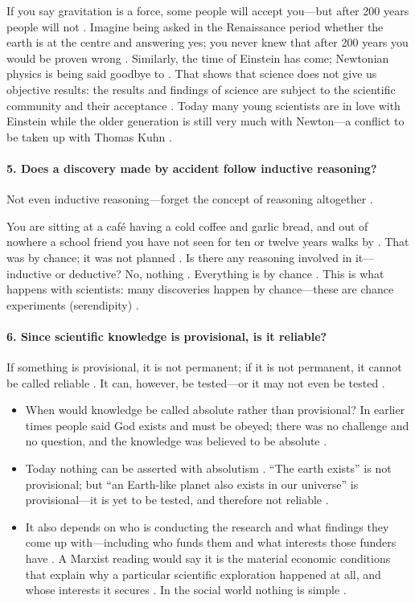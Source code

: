 If you say gravitation is a force, some people will accept you---but after 200 years people will not . Imagine being asked in the Renaissance period whether the earth is at the centre and answering yes; you never knew that after 200 years you would be proven wrong . Similarly, the time of Einstein has come; Newtonian physics is being said goodbye to . That shows that science does not give us objective results: the results and findings of science are subject to the scientific community and their acceptance . Today many young scientists are in love with Einstein while the older generation is still very much with Newton---a conflict to be taken up with Thomas Kuhn .

\paragraph{5. Does a discovery made by accident follow inductive reasoning?}
Not even inductive reasoning---forget the concept of reasoning altogether .

\begin{ExampleBox}
You are sitting at a café having a cold coffee and garlic bread, and out of nowhere a school friend you have not seen for ten or twelve years walks by . That was by chance; it was not planned . Is there any reasoning involved in it---inductive or deductive? No, nothing . Everything is by chance . This is what happens with scientists: many discoveries happen by chance---these are chance experiments (serendipity) .
\end{ExampleBox}

\paragraph{6. Since scientific knowledge is provisional, is it reliable?}
If something is provisional, it is not permanent; if it is not permanent, it cannot be called reliable . It can, however, be tested---or it may not even be tested .
\begin{itemize}
    \item When would knowledge be called absolute rather than provisional? In earlier times people said God exists and must be obeyed; there was no challenge and no question, and the knowledge was believed to be absolute .
    \item Today nothing can be asserted with absolutism . ``The earth exists'' is not provisional; but ``an Earth-like planet also exists in our universe'' is provisional---it is yet to be tested, and therefore not reliable .
    \item It also depends on who is conducting the research and what findings they come up with---including who funds them and what interests those funders have . A Marxist reading would say it is the material economic conditions that explain why a particular scientific exploration happened at all, and whose interests it secures . In the social world nothing is simple .
\end{itemize}

